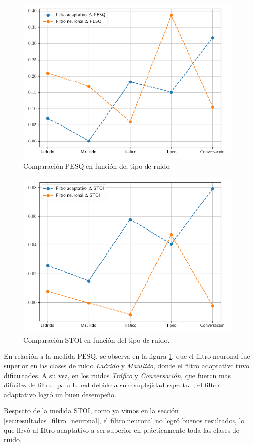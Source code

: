 \begin{figure}
	\centering
	\centerline{\includegraphics[scale=0.75]{images/ch8/comparison_pesq_by_noise.png}}
	\caption{Comparación PESQ en función del tipo de ruido.}
	\label{fig:ch8_pesq_comparison_by_noise}
\end{figure}

\begin{figure}
	\centering
	\centerline{\includegraphics[scale=0.75]{images/ch8/comparison_stoi_by_noise.png}}
	\caption{Comparación STOI en función del tipo de ruido.}
	\label{fig:ch8_stoi_comparison_by_noise}
\end{figure}

En relación a la medida PESQ, se observa en la figura \ref{fig:ch8_pesq_comparison_by_noise}, que el filtro neuronal fue superior en las clases de ruido \emph{Ladrido} y \emph{Maullido}, donde el filtro adaptativo tuvo dificultades. A su vez, en los ruidos \emph{Tráfico} y \emph{Conversación}, que fueron mas difíciles de filtrar para la red debido a su complejidad espectral, el filtro adaptativo logró un buen desempeño.

Respecto de la medida STOI, como ya vimos en la sección \ref{sec:resultados_filtro_neuronal}, el filtro neuronal no logró buenos resultados, lo que llevó al filtro adaptativo a ser superior en prácticamente toda las clases de ruido.